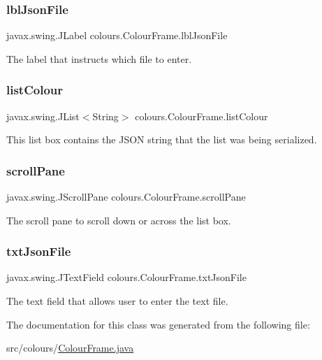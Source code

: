 \subsubsection{\texorpdfstring{lbl\+Json\+File}{lblJsonFile}}
{\footnotesize\ttfamily javax.\+swing.\+J\+Label colours.\+Colour\+Frame.\+lbl\+Json\+File\hspace{0.3cm}{\ttfamily [private]}}

The label that instructs which file to enter. \mbox{\label{classcolours_1_1_colour_frame_a9c6b0ac09f52427530bd1e0fbc285cc2}} 
\subsubsection{\texorpdfstring{list\+Colour}{listColour}}
{\footnotesize\ttfamily javax.\+swing.\+J\+List$<$String$>$ colours.\+Colour\+Frame.\+list\+Colour\hspace{0.3cm}{\ttfamily [private]}}

This list box contains the J\+S\+ON string that the list was being serialized. \mbox{\label{classcolours_1_1_colour_frame_a4101dbab121b9af67cb0ff9ef3c64a7a}} 
\subsubsection{\texorpdfstring{scroll\+Pane}{scrollPane}}
{\footnotesize\ttfamily javax.\+swing.\+J\+Scroll\+Pane colours.\+Colour\+Frame.\+scroll\+Pane\hspace{0.3cm}{\ttfamily [private]}}

The scroll pane to scroll down or across the list box. \mbox{\label{classcolours_1_1_colour_frame_adaffa1254ad772940748d49324e191a0}} 
\subsubsection{\texorpdfstring{txt\+Json\+File}{txtJsonFile}}
{\footnotesize\ttfamily javax.\+swing.\+J\+Text\+Field colours.\+Colour\+Frame.\+txt\+Json\+File\hspace{0.3cm}{\ttfamily [private]}}

The text field that allows user to enter the text file. 

The documentation for this class was generated from the following file\+:\begin{DoxyCompactItemize}
\item 
src/colours/\hyperlink{_colour_frame_8java}{Colour\+Frame.\+java}\end{DoxyCompactItemize}
